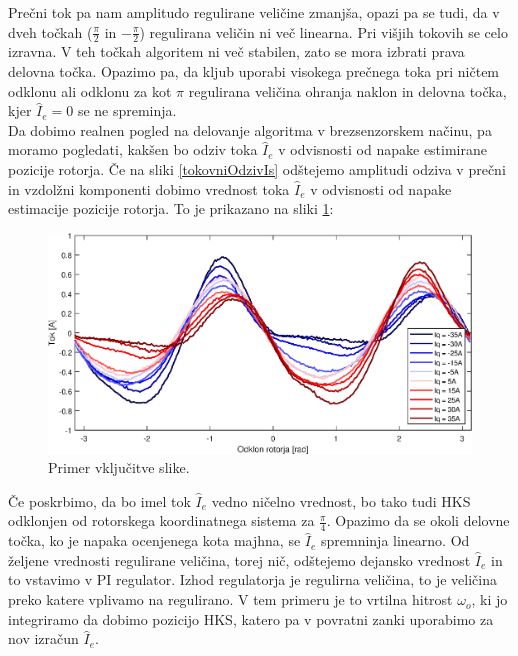 \documentclass[a4paper,twoside,openright,12pt,slovene]{book}
\begin{document}
Prečni tok pa nam amplitudo regulirane veličine zmanjša, opazi pa se tudi, da v dveh točkah ($\frac{\pi}{2}$ in $-\frac{\pi}{2}$) regulirana veličin ni več linearna. Pri višjih tokovih se celo izravna.
V teh točkah algoritem ni več stabilen, zato se mora izbrati prava delovna točka.
Opazimo pa, da kljub uporabi visokega prečnega toka pri ničtem odklonu ali odklonu za kot $\pi$ regulirana veličina ohranja naklon in delovna točka, kjer $\hat{I}_{e} = 0$ se ne spreminja.
\\
Da dobimo realnen pogled na delovanje algoritma v brezsenzorskem načinu, pa moramo pogledati, kakšen bo odziv toka $\hat{I}_{e}$ v odvisnosti od napake estimirane pozicije rotorja. Če na sliki
\ref{tokovniOdzivIs} odštejemo amplitudi odziva v prečni in vzdolžni komponenti dobimo vrednost toka $\hat{I}_{e}$ v odvisnosti od napake estimacije pozicije rotorja. To je prikazano na sliki
\ref{reguliranaVelicinaIs}:

\begin{figure}[!htbp]
    \centering
    \includegraphics[width=1\columnwidth]{Slike/reguliranaVelicinaIs.eps}
    \caption{\label{reguliranaVelicinaIs} Primer vključitve slike.}
\end{figure}

Če poskrbimo, da bo imel tok $\hat{I}_{e}$ vedno ničelno vrednost, bo tako tudi HKS odklonjen od rotorskega koordinatnega sistema za $\frac{\pi}{4}$. Opazimo da se okoli delovne točka, ko je napaka
ocenjenega kota majhna, se $\hat{I}_{e}$ spremninja linearno. Od željene vrednosti regulirane veličina, torej nič, odštejemo dejansko vrednost $\hat{I}_{e}$ in to vstavimo v PI regulator. Izhod
regulatorja je regulirna veličina, to je veličina preko katere vplivamo na regulirano. V tem primeru je to vrtilna hitrost $\omega_o$, ki jo integriramo da dobimo pozicijo HKS, katero pa v povratni zanki
uporabimo za nov izračun $\hat{I}_{e}$. 
\end{document}
